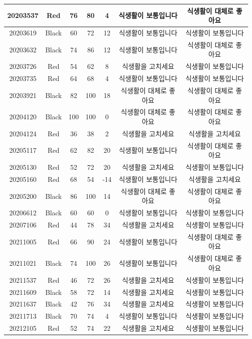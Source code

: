 \documentclass[
]{book}
\begin{document}
\begin{tabular}{c|c|c|c|c|c|c}
\hline
20203537 & Red & 76 & 80 & 4 & 식생활이 보통입니다 & 식생활이 대체로 좋아요\\
\hline
20203619 & Black & 60 & 72 & 12 & 식생활이 보통입니다 & 식생활이 보통입니다\\
\hline
20203632 & Black & 74 & 86 & 12 & 식생활이 보통입니다 & 식생활이 대체로 좋아요\\
\hline
20203726 & Red & 54 & 62 & 8 & 식생활을 고치세요 & 식생활이 보통입니다\\
\hline
20203735 & Red & 64 & 68 & 4 & 식생활이 보통입니다 & 식생활이 보통입니다\\
\hline
20203921 & Black & 82 & 100 & 18 & 식생활이 대체로 좋아요 & 식생활이 대체로 좋아요\\
\hline
20204120 & Black & 100 & 100 & 0 & 식생활이 대체로 좋아요 & 식생활이 대체로 좋아요\\
\hline
20204124 & Red & 36 & 38 & 2 & 식생활을 고치세요 & 식생활을 고치세요\\
\hline
20205117 & Red & 62 & 82 & 20 & 식생활이 보통입니다 & 식생활이 대체로 좋아요\\
\hline
20205130 & Red & 52 & 72 & 20 & 식생활을 고치세요 & 식생활이 보통입니다\\
\hline
20205160 & Red & 68 & 54 & -14 & 식생활이 보통입니다 & 식생활을 고치세요\\
\hline
20205200 & Black & 86 & 100 & 14 & 식생활이 대체로 좋아요 & 식생활이 대체로 좋아요\\
\hline
20206612 & Black & 60 & 60 & 0 & 식생활이 보통입니다 & 식생활이 보통입니다\\
\hline
20207106 & Red & 44 & 78 & 34 & 식생활을 고치세요 & 식생활이 보통입니다\\
\hline
20211005 & Red & 66 & 90 & 24 & 식생활이 보통입니다 & 식생활이 대체로 좋아요\\
\hline
20211021 & Black & 74 & 100 & 26 & 식생활이 보통입니다 & 식생활이 대체로 좋아요\\
\hline
20211537 & Red & 46 & 72 & 26 & 식생활을 고치세요 & 식생활이 보통입니다\\
\hline
20211609 & Black & 58 & 72 & 14 & 식생활을 고치세요 & 식생활이 보통입니다\\
\hline
20211637 & Black & 42 & 76 & 34 & 식생활을 고치세요 & 식생활이 보통입니다\\
\hline
20211713 & Black & 70 & 74 & 4 & 식생활이 보통입니다 & 식생활이 보통입니다\\
\hline
20212105 & Red & 52 & 74 & 22 & 식생활을 고치세요 & 식생활이 보통입니다\\

\end{tabular}
\end{document}
